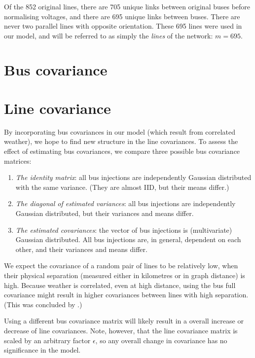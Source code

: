 \documentclass[main.tex]{subfiles}
\begin{document}
Of the 852 original lines, there are 705 unique links between original buses before normalising voltages, and there are 695 unique links between buses. There are never two parallel lines with opposite orientation. These 695 lines were used in our model, and will be referred to as simply the \emph{lines} of the network: $m = 695$.

\section{Bus covariance}


\section{Line covariance}

By incorporating bus covariances in our model (which result from correlated weather), we hope to find new structure in the line covariances. 
To assess the effect of estimating bus covariances, we compare three possible bus covariance matrices:
\begin{enumerate}
	\item \emph{The identity matrix}: all bus injections are independently Gaussian distributed with the same variance. (They are almost IID, but their means differ.)
	\item \emph{The diagonal of estimated variances}: all bus injections are independently Gaussian distributed, but their variances and means differ.
	\item \emph{The estimated covariances}: the vector of bus injections is (multivariate) Gaussian distributed. All bus injections are, in general, dependent on each other, and their variances and means differ.
\end{enumerate}

We expect the covariance of a random pair of lines to be relatively low, when their physical separation (measured either in kilometres or in graph distance) is high. 
Because weather is correlated, even at high distance, using the bus full covariance might result in higher covariances between lines with high separation. (This was concluded by \cite{Nesti2018emergentfailures}.) 

Using a different bus covariance matrix will likely result in a overall increase or decrease of line covariances. Note, however, that the line covariance matrix is scaled by an arbitrary factor $\epsilon$, so any overall change in covariance has no significance in the model. 
\end{document}
